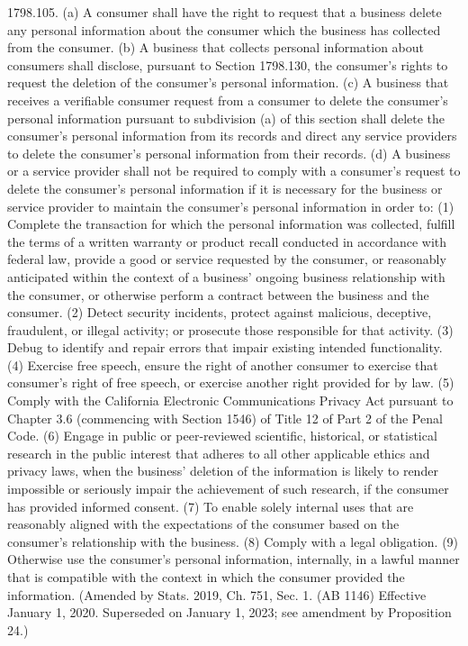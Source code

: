 1798.105.  (a) A consumer shall have the right to request that a business delete any personal information about the consumer which the business has collected from the consumer.
(b) A business that collects personal information about consumers shall disclose, pursuant to Section 1798.130, the consumer’s rights to request the deletion of the consumer’s personal information.
(c) A business that receives a verifiable consumer request from a consumer to delete the consumer’s personal information pursuant to subdivision (a) of this section shall delete the consumer’s personal information from its records and direct any service providers to delete the consumer’s personal information from their records.
(d) A business or a service provider shall not be required to comply with a consumer’s request to delete the consumer’s personal information if it is necessary for the business or service provider to maintain the consumer’s personal information in order to:
(1) Complete the transaction for which the personal information was collected, fulfill the terms of a written warranty or product recall conducted in accordance with federal law, provide a good or service requested by the consumer, or reasonably anticipated within the context of a business’ ongoing business relationship with the consumer, or otherwise perform a contract between the business and the consumer.
(2) Detect security incidents, protect against malicious, deceptive, fraudulent, or illegal activity; or prosecute those responsible for that activity.
(3) Debug to identify and repair errors that impair existing intended functionality.
(4) Exercise free speech, ensure the right of another consumer to exercise that consumer’s right of free speech, or exercise another right provided for by law.
(5) Comply with the California Electronic Communications Privacy Act pursuant to Chapter 3.6 (commencing with Section 1546) of Title 12 of Part 2 of the Penal Code.
(6) Engage in public or peer-reviewed scientific, historical, or statistical research in the public interest that adheres to all other applicable ethics and privacy laws, when the business’ deletion of the information is likely to render impossible or seriously impair the achievement of such research, if the consumer has provided informed consent.
(7) To enable solely internal uses that are reasonably aligned with the expectations of the consumer based on the consumer’s relationship with the business.
(8) Comply with a legal obligation.
(9) Otherwise use the consumer’s personal information, internally, in a lawful manner that is compatible with the context in which the consumer provided the information.
(Amended by Stats. 2019, Ch. 751, Sec. 1. (AB 1146) Effective January 1, 2020. Superseded on January 1, 2023; see amendment by Proposition 24.)

